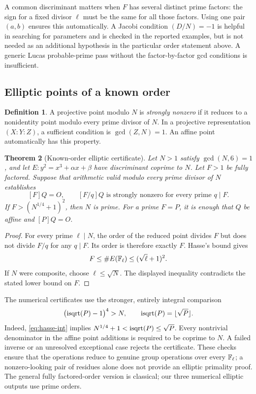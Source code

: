 \documentclass[11pt,a4paper]{article}
\newtheorem{theorem}{Theorem}[section]
\theoremstyle{definition}\newtheorem{definition}[theorem]{Definition}
\theoremstyle{remark}\newtheorem{remark}[theorem]{Remark}
\begin{document}
A common discriminant matters when $F$ has several distinct prime factors:
the sign for a fixed divisor $\ell$ must be the same for all those factors.
Using one pair $(a,b)$ ensures this automatically. A Jacobi condition
$(D/N)=-1$ is helpful in searching for parameters and is checked in the
reported examples, but is not needed as an additional hypothesis in the
particular order statement above. A generic Lucas probable-prime pass without
the factor-by-factor gcd conditions is insufficient.

\subsection{Elliptic points of a known order}

\begin{definition}
A projective point modulo $N$ is \emph{strongly nonzero} if it reduces to a
nonidentity point modulo every prime divisor of $N$. In a projective
representation $(X:Y:Z)$, a sufficient condition is $\gcd(Z,N)=1$. An affine
point automatically has this property.
\end{definition}

\begin{theorem}[Known-order elliptic certificate]\label{thm:ec}
Let $N>1$ satisfy $\gcd(N,6)=1$, and let
$E:y^2=x^3+\alpha x+\beta$ have discriminant coprime to $N$.
Let $F>1$ be fully factored. Suppose that arithmetic valid modulo every prime
divisor of $N$ establishes
\[
 [F]Q=O,\qquad [F/q]Q\text{ is strongly nonzero for every prime }q\mid F.
\]
If $F>(N^{1/4}+1)^2$, then $N$ is prime. For a prime $F=P$, it is enough that
$Q$ be affine and $[P]Q=O$.
\end{theorem}

\begin{proof}
For every prime $\ell\mid N$, the order of the reduced point divides $F$ but
does not divide $F/q$ for any $q\mid F$. Its order is therefore exactly $F$.
Hasse's bound gives
\[
 F\le\#E(\mathbb F_\ell)\le(\sqrt\ell+1)^2.
\]
If $N$ were composite, choose $\ell\le\sqrt N$. The displayed inequality
contradicts the stated lower bound on $F$.
\end{proof}

The numerical certificates use the stronger, entirely integral comparison
\begin{equation}\label{eq:hasse-int}
 \bigl(\operatorname{isqrt}(P)-1\bigr)^4>N,
 \qquad \operatorname{isqrt}(P)=\lfloor\sqrt P\rfloor.
\end{equation}
Indeed, \eqref{eq:hasse-int} implies $N^{1/4}+1<\operatorname{isqrt}(P)\le\sqrt P$.
Every nontrivial denominator in the affine point additions is required to be
coprime to $N$. A failed inverse or an unresolved exceptional case rejects the
certificate. These checks ensure that the operations reduce to genuine group
operations over every $\mathbb F_\ell$; a nonzero-looking pair of residues alone does
not provide an elliptic primality proof. The general fully factored-order
version is classical; our three numerical elliptic outputs use prime orders.
\end{document}
